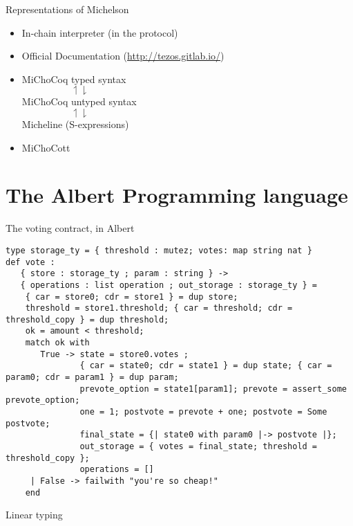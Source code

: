 \documentclass[aspectratio=169]{beamer}
\begin{document}
\begin{frame}{Representations of Michelson}
  \begin{itemize}
    \item In-chain interpreter (in the protocol)
    \item Official Documentation (\url{http://tezos.gitlab.io/})
    \item MiChoCoq typed syntax\\
      $\mspace{90mu}\upharpoonleft \downharpoonright$ \\
      MiChoCoq untyped syntax \\
      $\mspace{90mu}\upharpoonleft \downharpoonright$ \\
      Micheline (S-expressions)
    \item MiChoCott
  \end{itemize}
\end{frame}

\section{The Albert Programming language}

\begin{frame}[fragile]{The voting contract, in Albert}
\begin{lstlisting}[language=albert,basicstyle=\footnotesize]
type storage_ty = { threshold : mutez; votes: map string nat }
def vote :
   { store : storage_ty ; param : string } ->
   { operations : list operation ; out_storage : storage_ty } =
    { car = store0; cdr = store1 } = dup store;
    threshold = store1.threshold; { car = threshold; cdr = threshold_copy } = dup threshold;
    ok = amount < threshold;
    match ok with
       True -> state = store0.votes ;
               { car = state0; cdr = state1 } = dup state; { car = param0; cdr = param1 } = dup param;
               prevote_option = state1[param1]; prevote = assert_some prevote_option;
               one = 1; postvote = prevote + one; postvote = Some postvote;
               final_state = {| state0 with param0 |-> postvote |};
               out_storage = { votes = final_state; threshold = threshold_copy };
               operations = []
     | False -> failwith "you're so cheap!"
    end
\end{lstlisting}
\end{frame}

\begin{frame}{Linear typing}
\end{frame}
\end{document}
